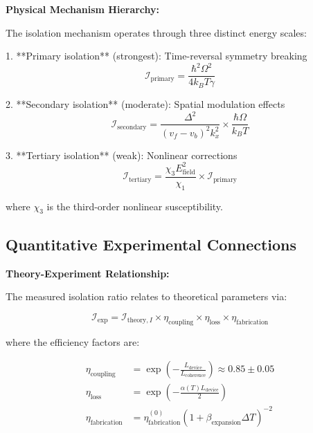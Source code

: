 \documentclass[11pt]{article}
\begin{document}
\textbf{Physical Mechanism Hierarchy:}

The isolation mechanism operates through three distinct energy scales:

1. **Primary isolation** (strongest): Time-reversal symmetry breaking
   \begin{equation}
   \mathcal{I}_{\text{primary}} = \frac{\hbar^2\Omega^2}{4k_B T \gamma}
   \end{equation}

2. **Secondary isolation** (moderate): Spatial modulation effects
   \begin{equation}
   \mathcal{I}_{\text{secondary}} = \frac{\Delta^2}{(v_f - v_b)^2 k_x^2} \times \frac{\hbar\Omega}{k_B T}
   \end{equation}

3. **Tertiary isolation** (weak): Nonlinear corrections
   \begin{equation}
   \mathcal{I}_{\text{tertiary}} = \frac{\chi_3 E_{\text{field}}^2}{\chi_1} \times \mathcal{I}_{\text{primary}}
   \end{equation}

where $\chi_3$ is the third-order nonlinear susceptibility.

\subsection{Quantitative Experimental Connections}

\textbf{Theory-Experiment Relationship:}

The measured isolation ratio relates to theoretical parameters via:

\begin{equation}
\mathcal{I}_{\text{exp}} = \mathcal{I}_{\text{theory},I} \times \eta_{\text{coupling}} \times \eta_{\text{loss}} \times \eta_{\text{fabrication}}
\end{equation}

where the efficiency factors are:

\begin{align}
\eta_{\text{coupling}} &= \exp\left(-\frac{L_{\text{device}}}{L_{\text{coherence}}}\right) \approx 0.85 \pm 0.05 \\
\eta_{\text{loss}} &= \exp\left(-\frac{\alpha(T) L_{\text{device}}}{2}\right) \\
\eta_{\text{fabrication}} &= \eta_{\text{fabrication}}^{(0)} \left(1 + \beta_{\text{expansion}} \Delta T\right)^{-2}
\end{align}
\end{document}
